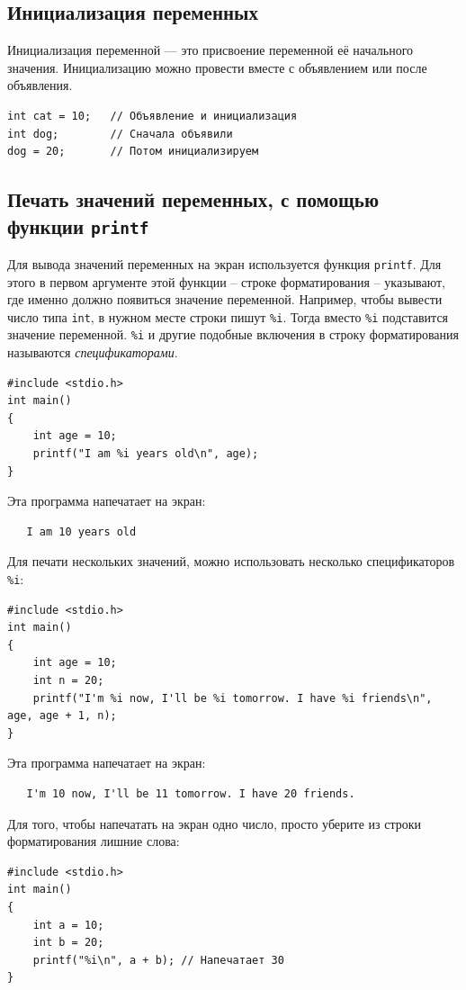 \documentclass[10pt]{article}
\begin{document}
\subsection*{Инициализация переменных}
Инициализация переменной --- это присвоение переменной её начального значения. Инициализацию можно провести вместе с объявлением или после объявления.
\begin{lstlisting}
int cat = 10;	// Объявление и инициализация
int dog;		// Сначала объявили
dog = 20;       // Потом инициализируем
\end{lstlisting}

\subsection*{Печать значений переменных, с помощью функции \texttt{printf}}
Для вывода значений переменных на экран используется функция \texttt{printf}.
Для этого в первом аргументе этой функции -- строке форматирования -- указывают, где именно должно появиться значение переменной. Например, чтобы вывести число типа \texttt{int}, в нужном месте строки пишут \texttt{\%i}. Тогда вместо  \texttt{\%i}  подставится значение переменной. \texttt{\%i} и другие подобные включения в строку форматирования называются \textit{спецификаторами}.
\begin{lstlisting}
#include <stdio.h>
int main()
{
    int age = 10;
    printf("I am %i years old\n", age);
}
\end{lstlisting}
Эта программа напечатает на экран:
\begin{verbatim}
   I am 10 years old
\end{verbatim}
Для печати нескольких значений, можно использовать несколько спецификаторов \texttt{\%i}:
\begin{lstlisting}
#include <stdio.h>
int main()
{
    int age = 10;
    int n = 20;
    printf("I'm %i now, I'll be %i tomorrow. I have %i friends\n", age, age + 1, n);
}
\end{lstlisting}
Эта программа напечатает на экран:
\begin{verbatim}
   I'm 10 now, I'll be 11 tomorrow. I have 20 friends.
\end{verbatim}
Для того, чтобы напечатать на экран одно число, просто уберите из строки форматирования лишние слова:
\begin{lstlisting}
#include <stdio.h>
int main()
{
    int a = 10;
    int b = 20;
    printf("%i\n", a + b); // Напечатает 30
}
\end{lstlisting}
\end{document}
